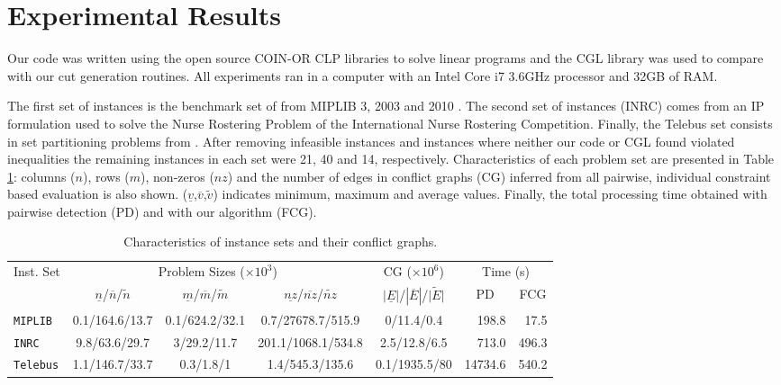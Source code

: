\documentclass{endm}
\begin{document}
\begin{figure}
\begin{center}
\label{figOH}
\end{center}
\end{figure}

\section{Experimental Results}\label{experiments}

Our code was written using the open source COIN-OR CLP libraries to solve linear programs and the CGL library was used to compare with our cut generation routines. All experiments ran in a computer with an Intel Core i7 3.6GHz processor and 32GB of RAM.

The first set of instances is the benchmark set of from MIPLIB 3, 2003 and 2010 \cite{miplib}. The second set of instances (INRC) comes from an IP formulation  used to solve the Nurse Rostering Problem \cite{Santos2014} of the International Nurse Rostering Competition. Finally, the Telebus set consists in set partitioning problems from \cite{Borndorfer1998}. After removing infeasible instances and instances where neither our code or CGL found violated inequalities the remaining instances in each set were 21, 40 and 14, respectively. Characteristics of each problem set are presented in Table \ref{tab:inst}: columns ($n$), rows ($m$), non-zeros ($nz$) and the number of edges in conflict graphs (CG) inferred from all pairwise, individual constraint based evaluation is also shown. ($\underline{v}$,$\overline{v}$,$\tilde{v}$) indicates minimum, maximum and average values. Finally, the total processing time obtained with pairwise detection (PD) and with our algorithm (FCG). 

\begin{table}[h]
\scriptsize
\caption{Characteristics of instance sets and their conflict graphs.}\label{tab:inst}
\begin{center}
\begin{tabular}{|l|c|c|c|c|r|r|}
\hline 
\multirow{2}{0.8cm}{Inst. Set} & \multicolumn{3}{c|}{{Problem Sizes ($\times10^{3}$)}} & {CG ($\times10^{6}$)} & \multicolumn{2}{c|}{{Time (s)}}\tabularnewline
\cline{2-7} 
 & {$\underline{n}$/$\overline{n}$/$\tilde{n}$} & {$\underline{m}$/$\overline{m}$/$\tilde{m}$} & {$\underline{nz}$/$\overline{nz}$/$\tilde{nz}$} & {$|\underline{E}|$/$|\overline{E}|$/$\tilde{|E|}$} & \multicolumn{1}{c|}{PD} & \multicolumn{1}{c|}{FCG}\tabularnewline
\hline 
\hline 
\texttt{MIPLIB} & {0.1/164.6/13.7} & {0.1/624.2/32.1} & {0.7/27678.7/515.9} & {0/11.4/0.4} & {198.8} & {17.5}\tabularnewline
\hline 
\texttt{INRC} & {9.8/63.6/29.7} & {3/29.2/11.7} & {201.1/1068.1/534.8} & {2.5/12.8/6.5} & {713.0} & {496.3}\tabularnewline
\hline 
\texttt{Telebus} & {1.1/146.7/33.7} & {0.3/1.8/1} & {1.4/545.3/135.6} & {0.1/1935.5/80} & {14734.6} & {540.2}\tabularnewline
\hline 
\end{tabular}
\end{center}
\end{table}
\end{document}
